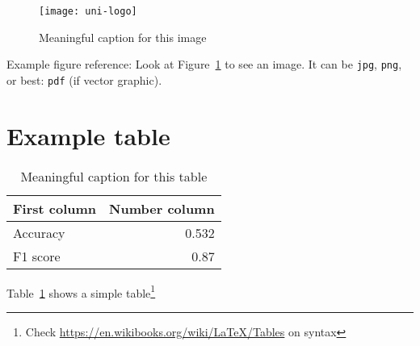 \begin{figure}
	\centering
	\texttt{[image: uni-logo]}
	\caption{Meaningful caption for this image}
	\label{fig:uniLogo}
\end{figure}

Example figure reference: Look at Figure~\ref{fig:uniLogo} to see an image. It can be \texttt{jpg}, \texttt{png}, or best: \texttt{pdf} (if vector graphic).

\section{Example table}

\begin{table}
	\centering
	\begin{tabular}{lr}
		First column & Number column \\
		\hline
		Accuracy & 0.532 \\
		F1 score & 0.87
	\end{tabular}
	\caption{Meaningful caption for this table}
	\label{tab:result}
\end{table}

Table~\ref{tab:result} shows a simple table\footnote{Check \url{https://en.wikibooks.org/wiki/LaTeX/Tables} on syntax}